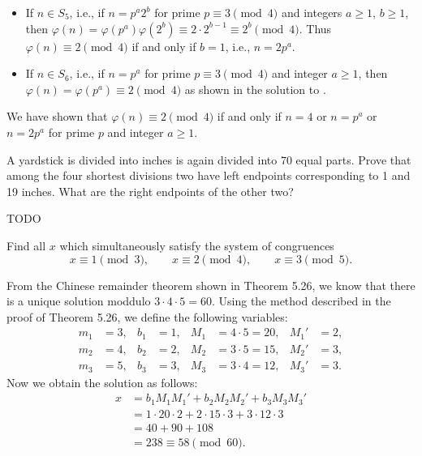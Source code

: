 \begin{solution}
\begin{itemize}
  \item
    If \( n \in S_5 \), i.e., if \( n = p^a 2^b \) for prime \( p
    \equiv 3 \pmod{4} \) and integers \( a \ge 1 \), \( b \ge 1 \),
    then \( \varphi(n) = \varphi(p^a) \varphi(2^b) \equiv 2 \cdot 2^{b
      - 1} \equiv 2^b \pmod{4} \). Thus \( \varphi(n) \equiv 2
    \pmod{4} \) if and only if \( b = 1 \), i.e., \( n = 2p^a \).
  \item
    If \( n \in S_6 \), i.e., if \( n = p^a \) for prime \( p \equiv 3
    \pmod{4} \) and integer \( a \ge 1 \), then \( \varphi(n) =
    \varphi(p^a) \equiv 2 \pmod{4} \) as shown in the solution to
    .
  \end{itemize}
  We have shown that \( \varphi(n) \equiv 2 \pmod{4} \) if and only if
  \( n = 4 \) or \( n = p^a \) or \( n = 2p^a \) for prime \( p \) and
  integer \( a \ge 1 \).
\end{solution}


\begin{exercise}{5}{}
  A yardstick is divided into inches is again divided into 70 equal
  parts. Prove that among the four shortest divisions two have left
  endpoints corresponding to 1 and 19 inches. What are the right
  endpoints of the other two?
\end{exercise}

\begin{solution}
  TODO
\end{solution}


\begin{exercise}{6}{}
  Find all \( x \) which simultaneously satisfy the system of congruences
  \[
    x \equiv 1 \pmod{3}, \qquad
    x \equiv 2 \pmod{4}, \qquad
    x \equiv 3 \pmod{5}.
  \]
\end{exercise}

\begin{solution}
  From the Chinese remainder theorem shown in Theorem 5.26, we know
  that there is a unique solution moddulo \( 3 \cdot 4 \cdot 5 = 60
  \). Using the method described in the proof of Theorem 5.26, we
  define the following variables:
  \begin{align*}
    m_1 & = 3, & b_1 & = 1, & M_1 & = 4 \cdot 5 = 20, & M_1' & = 2, \\
    m_2 & = 4, & b_2 & = 2, & M_2 & = 3 \cdot 5 = 15, & M_2' & = 3, \\
    m_3 & = 5, & b_3 & = 3, & M_3 & = 3 \cdot 4 = 12, & M_3' & = 3.
  \end{align*}
  Now we obtain the solution as follows:
  \begin{align*}
    x & = b_1 M_1 M_1' + b_2 M_2 M_2' + b_3 M_3 M_3' \\
    & = 1 \cdot 20 \cdot 2 + 2 \cdot 15 \cdot 3 + 3 \cdot 12 \cdot 3 \\
    & = 40 + 90 + 108 \\
    & = 238 \equiv 58 \pmod{60}.
  \end{align*}
\end{solution}


